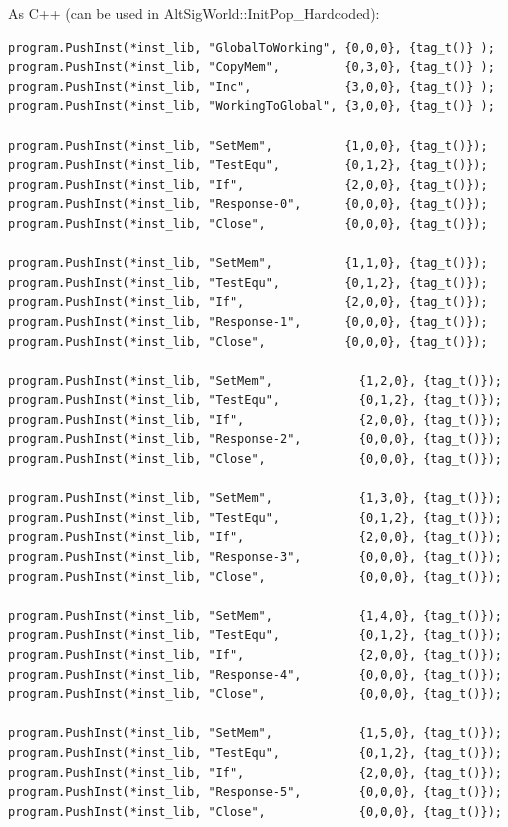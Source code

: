 \documentclass[
]{book}
\begin{document}
As C++ (can be used in AltSigWorld::InitPop\_Hardcoded):

\begin{verbatim}
program.PushInst(*inst_lib, "GlobalToWorking", {0,0,0}, {tag_t()} );
program.PushInst(*inst_lib, "CopyMem",         {0,3,0}, {tag_t()} );
program.PushInst(*inst_lib, "Inc",             {3,0,0}, {tag_t()} );
program.PushInst(*inst_lib, "WorkingToGlobal", {3,0,0}, {tag_t()} );

program.PushInst(*inst_lib, "SetMem",          {1,0,0}, {tag_t()});
program.PushInst(*inst_lib, "TestEqu",         {0,1,2}, {tag_t()});
program.PushInst(*inst_lib, "If",              {2,0,0}, {tag_t()});
program.PushInst(*inst_lib, "Response-0",      {0,0,0}, {tag_t()});
program.PushInst(*inst_lib, "Close",           {0,0,0}, {tag_t()});

program.PushInst(*inst_lib, "SetMem",          {1,1,0}, {tag_t()});
program.PushInst(*inst_lib, "TestEqu",         {0,1,2}, {tag_t()});
program.PushInst(*inst_lib, "If",              {2,0,0}, {tag_t()});
program.PushInst(*inst_lib, "Response-1",      {0,0,0}, {tag_t()});
program.PushInst(*inst_lib, "Close",           {0,0,0}, {tag_t()});

program.PushInst(*inst_lib, "SetMem",            {1,2,0}, {tag_t()});
program.PushInst(*inst_lib, "TestEqu",           {0,1,2}, {tag_t()});
program.PushInst(*inst_lib, "If",                {2,0,0}, {tag_t()});
program.PushInst(*inst_lib, "Response-2",        {0,0,0}, {tag_t()});
program.PushInst(*inst_lib, "Close",             {0,0,0}, {tag_t()});

program.PushInst(*inst_lib, "SetMem",            {1,3,0}, {tag_t()});
program.PushInst(*inst_lib, "TestEqu",           {0,1,2}, {tag_t()});
program.PushInst(*inst_lib, "If",                {2,0,0}, {tag_t()});
program.PushInst(*inst_lib, "Response-3",        {0,0,0}, {tag_t()});
program.PushInst(*inst_lib, "Close",             {0,0,0}, {tag_t()});

program.PushInst(*inst_lib, "SetMem",            {1,4,0}, {tag_t()});
program.PushInst(*inst_lib, "TestEqu",           {0,1,2}, {tag_t()});
program.PushInst(*inst_lib, "If",                {2,0,0}, {tag_t()});
program.PushInst(*inst_lib, "Response-4",        {0,0,0}, {tag_t()});
program.PushInst(*inst_lib, "Close",             {0,0,0}, {tag_t()});

program.PushInst(*inst_lib, "SetMem",            {1,5,0}, {tag_t()});
program.PushInst(*inst_lib, "TestEqu",           {0,1,2}, {tag_t()});
program.PushInst(*inst_lib, "If",                {2,0,0}, {tag_t()});
program.PushInst(*inst_lib, "Response-5",        {0,0,0}, {tag_t()});
program.PushInst(*inst_lib, "Close",             {0,0,0}, {tag_t()});


\end{verbatim}
\end{document}
